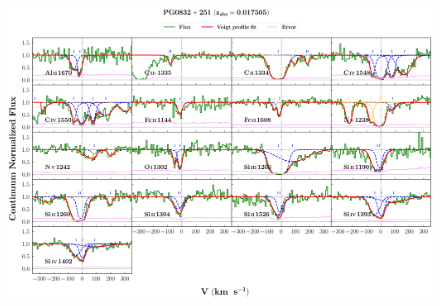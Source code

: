 \documentclass[12pt]{report}
\begin{document}
\begin{landscape}

\begin{figure}
    \centering
    \vspace{-20mm}
    \hspace*{-35mm}
    \includegraphics[width=1.25\linewidth]{System-Plots/PG0832+251_z=0.017505_sys_plot.png}
\end{figure}

\end{landscape}
\end{document}
